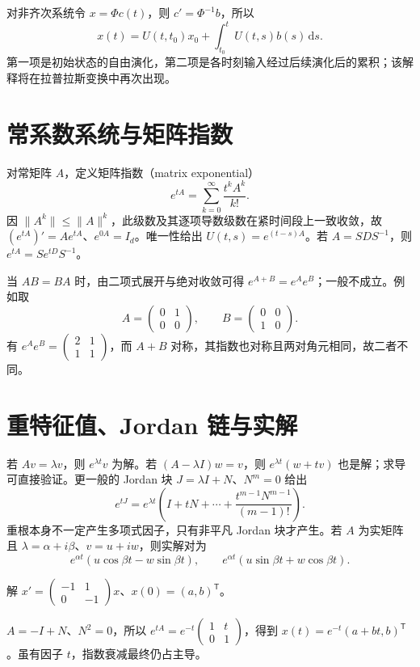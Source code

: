 \documentclass[UTF8,12pt,a4paper,fontset=fandol]{ctexbook}
\begin{document}
对非齐次系统令 $x=\Phi c(t)$，则 $c'=\Phi^{-1}b$，所以
\begin{equation}
 x(t)=U(t,t_0)x_0+\int_{t_0}^t U(t,s)b(s)\,\mathrm ds.
 \label{eq:ode-system-variation}
\end{equation}
第一项是初始状态的自由演化，第二项是各时刻输入经过后续演化后的累积；该解释将在拉普拉斯变换中再次出现。

\section{常系数系统与矩阵指数}
对常矩阵 $A$，定义矩阵指数（matrix exponential）
\[
 e^{tA}=\sum_{k=0}^\infty\frac{t^kA^k}{k!}.
\]
因 $\|A^k\|\leq\|A\|^k$，此级数及其逐项导数级数在紧时间段上一致收敛，故 $(e^{tA})'=Ae^{tA}$、$e^{0A}=I_d$。唯一性给出 $U(t,s)=e^{(t-s)A}$。若 $A=SDS^{-1}$，则 $e^{tA}=Se^{tD}S^{-1}$。

当 $AB=BA$ 时，由二项式展开与绝对收敛可得 $e^{A+B}=e^Ae^B$；一般不成立。例如取
\[
 A=\begin{pmatrix}0&1\\0&0\end{pmatrix},\qquad B=\begin{pmatrix}0&0\\1&0\end{pmatrix}.
\]
有 $e^Ae^B=\begin{pmatrix}2&1\\1&1\end{pmatrix}$，而 $A+B$ 对称，其指数也对称且两对角元相同，故二者不同。

\section{重特征值、Jordan 链与实解}
若 $Av=\lambda v$，则 $e^{\lambda t}v$ 为解。若 $(A-\lambda I)w=v$，则 $e^{\lambda t}(w+tv)$ 也是解；求导可直接验证。更一般的 Jordan 块 $J=\lambda I+N$、$N^m=0$ 给出
\[
 e^{tJ}=e^{\lambda t}\left(I+tN+\cdots+\frac{t^{m-1}N^{m-1}}{(m-1)!}\right).
\]
重根本身不一定产生多项式因子，只有非平凡 Jordan 块才产生。若 $A$ 为实矩阵且 $\lambda=\alpha+i\beta$、$v=u+iw$，则实解对为
\[
 e^{\alpha t}(u\cos\beta t-w\sin\beta t),\qquad
 e^{\alpha t}(u\sin\beta t+w\cos\beta t).
\]

\begin{example}
解 $x'=\begin{pmatrix}-1&1\\0&-1\end{pmatrix}x$、$x(0)=(a,b)^{\mathsf T}$。
\end{example}
\begin{solve}
$A=-I+N$、$N^2=0$，所以 $e^{tA}=e^{-t}\begin{pmatrix}1&t\\0&1\end{pmatrix}$，得到 $x(t)=e^{-t}(a+bt,b)^{\mathsf T}$。虽有因子 $t$，指数衰减最终仍占主导。
\end{solve}
\end{document}

